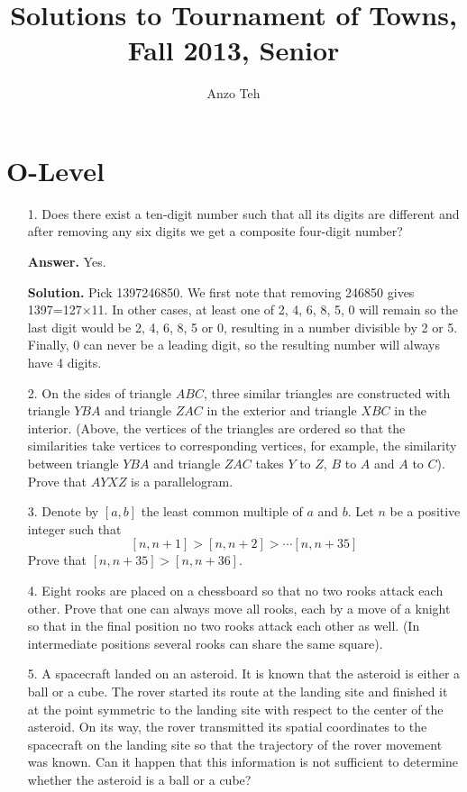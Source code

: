 \documentclass[11pt,a4paper]{article}
\begin{document}
\newcommand{\la}{\leftarrow}
\newcommand{\lra}{\leftrightarrow}
\newcommand{\bbN}{\mathbb{N}}
\newcommand{\bbZ}{\mathbb{Z}}
\newcommand{\dsum}{\displaystyle\sum}
\newcommand{\dprod}{\displaystyle\prod}


\title{Solutions to Tournament of Towns, Fall 2013, Senior}
\author{Anzo Teh}
\date{}
\maketitle

\section*{O-Level}
\begin{enumerate}
	\item[1.] 
	Does there exist a ten-digit number such that all its digits are different and after removing any six digits we get a composite four-digit
	number?
	
	\textbf{Answer.} Yes. 
	
	\textbf{Solution.} Pick 1397246850. 
	We first note that removing 246850 gives 1397=127$\times$11. 
	In other cases, at least one of 2, 4, 6, 8, 5, 0 will remain so the last digit would be 2, 4, 6, 8, 5 or 0, 
	resulting in a number divisible by 2 or 5. 
	Finally, 0 can never be a leading digit, so the resulting number will always have 4 digits. 
	
	\item[2.]
	On the sides of triangle $ABC$, three similar triangles are constructed with triangle $Y BA$ and triangle $ZAC$ in the exterior and triangle $XBC$ in the interior. 
	(Above, the vertices of the triangles are ordered so that the similarities take vertices to corresponding vertices, for example, the similarity between triangle $Y BA$ and triangle $ZAC$ takes
	$Y$ to $Z$, $B$ to $A$ and $A$ to $C$). Prove that $AY XZ$ is a parallelogram.
	
	\item[3.]
	Denote by $[a, b]$ the least common multiple of $a$ and $b$. Let $n$ be a
	positive integer such that
	\[
	[n, n+1] > [n, n+2] > \cdots [n, n+35]
	\]
	Prove that $[n, n+35]>[n, n+36]$. 
	
	\item[4.]
	Eight rooks are placed on a chessboard so that no two rooks attack
	each other. Prove that one can always move all rooks, each by a move
	of a knight so that in the final position no two rooks attack each other
	as well. (In intermediate positions several rooks can share the same
	square).
	
	\item[5.]
	A spacecraft landed on an asteroid. It is known that the asteroid is
	either a ball or a cube. The rover started its route at the landing site
	and finished it at the point symmetric to the landing site with respect
	to the center of the asteroid. On its way, the rover transmitted its
	spatial coordinates to the spacecraft on the landing site so that the
	trajectory of the rover movement was known. Can it happen that
	this information is not sufficient to determine whether the asteroid is
	a ball or a cube?
\end{enumerate}
\end{document}
